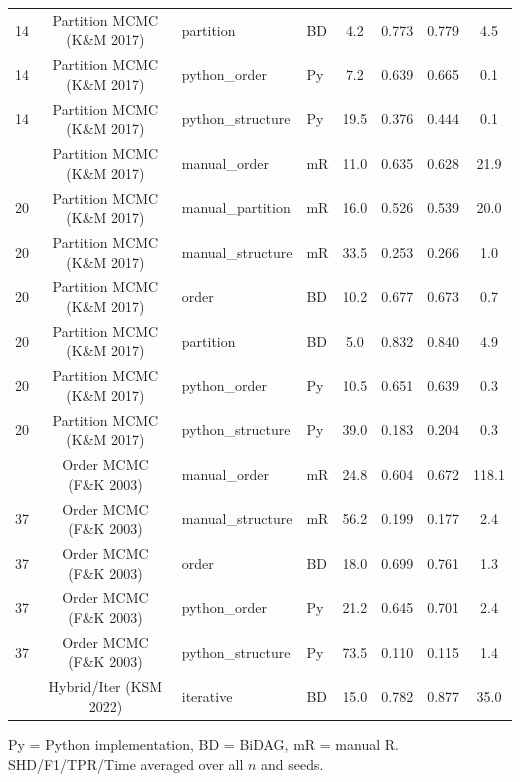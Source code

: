 \begin{table}[htbp]
\begin{tabular}{c c l l c c c c}
14 & Partition MCMC (K\&M 2017) & partition & BD & 4.2 & 0.773 & 0.779 & 4.5 \\
14 & Partition MCMC (K\&M 2017) & python\_order & Py & 7.2 & 0.639 & 0.665 & 0.1 \\
14 & Partition MCMC (K\&M 2017) & python\_structure & Py & 19.5 & 0.376 & 0.444 & 0.1 \\
\addlinespace[2pt]
20 & Partition MCMC (K\&M 2017) & manual\_order & mR & 11.0 & 0.635 & 0.628 & 21.9 \\
20 & Partition MCMC (K\&M 2017) & manual\_partition & mR & 16.0 & 0.526 & 0.539 & 20.0 \\
20 & Partition MCMC (K\&M 2017) & manual\_structure & mR & 33.5 & 0.253 & 0.266 & 1.0 \\
20 & Partition MCMC (K\&M 2017) & order & BD & 10.2 & 0.677 & 0.673 & 0.7 \\
20 & Partition MCMC (K\&M 2017) & partition & BD & 5.0 & 0.832 & 0.840 & 4.9 \\
20 & Partition MCMC (K\&M 2017) & python\_order & Py & 10.5 & 0.651 & 0.639 & 0.3 \\
20 & Partition MCMC (K\&M 2017) & python\_structure & Py & 39.0 & 0.183 & 0.204 & 0.3 \\
\addlinespace[2pt]
37 & Order MCMC (F\&K 2003) & manual\_order & mR & 24.8 & 0.604 & 0.672 & 118.1 \\
37 & Order MCMC (F\&K 2003) & manual\_structure & mR & 56.2 & 0.199 & 0.177 & 2.4 \\
37 & Order MCMC (F\&K 2003) & order & BD & 18.0 & 0.699 & 0.761 & 1.3 \\
37 & Order MCMC (F\&K 2003) & python\_order & Py & 21.2 & 0.645 & 0.701 & 2.4 \\
37 & Order MCMC (F\&K 2003) & python\_structure & Py & 73.5 & 0.110 & 0.115 & 1.4 \\
\addlinespace[2pt]
40 & Hybrid/Iter (KSM 2022) & iterative & BD & 15.0 & 0.782 & 0.877 & 35.0 \\
\bottomrule
\end{tabular}
\begin{flushleft}\footnotesize Py = Python implementation, BD = BiDAG, mR = manual R. SHD/F1/TPR/Time averaged over all $n$ and seeds.\end{flushleft}
\end{table}
